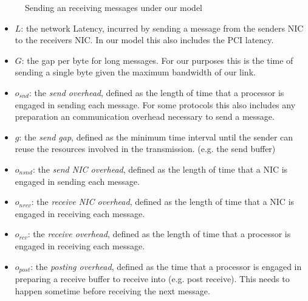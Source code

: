 \begin{figure}[!htp]
\begin{center}
\end{center}
\caption{Sending an receiving messages under our model}
\label{fig:model-base}
\end{figure}




\begin{itemize}
  \item $L$: the network Latency, incurred by sending a message from the senders NIC to the receivers NIC. In our model 
    this also includes the PCI latency.
  \item $G$: the gap per byte for long messages. For our purposes this is the time of sending a single byte given the 
    maximum bandwidth of our link.
  \item $o_{snd}$: the \emph{send overhead}, defined as the length of time that a processor is engaged in sending each message.
    For some protocols this also includes any preparation an communication overhead necessary to send a message.
  \item $g$: the \emph{send gap}, defined as the minimum time interval until the sender can reuse the resources involved in 
    the transmission. (e.g. the send buffer) 
  \item $o_{nsnd}$: the \emph{send NIC overhead}, defined as the length of time that a NIC is engaged in sending each message.
  \item $o_{nrcv}$: the \emph{receive NIC overhead}, defined as the length of time that a NIC is engaged in receiving each message.
  \item $o_{rcv}$: the \emph{receive overhead}, defined as the length of time that a processor is engaged in receiving each message.
  \item $o_{post}$: the \emph{posting overhead}, defined as the time that a processor is engaged in preparing a receive buffer
    to receive into (e.g. post receive). This needs to happen sometime before receiving the next message.
\end{itemize}

